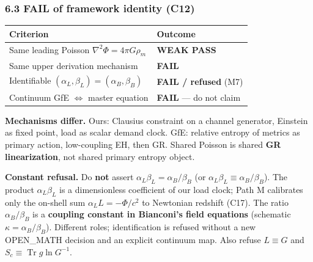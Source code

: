 \documentclass[
  11pt,
]{article}
\newcounter{none} %
\begin{document}
\subsubsection{\texorpdfstring{6.3 FAIL of framework identity
(\textbf{C12})}{6.3 FAIL of framework identity (C12)}}\label{fail-of-framework-identity-c12}

{\def\LTcaptype{none} %
\begin{longtable}[]{@{}
  >{\raggedright\arraybackslash}p{}
  >{\raggedright\arraybackslash}p{}@{}}
\toprule\noalign{}
\begin{minipage}[b]{\linewidth}\raggedright
Criterion
\end{minipage} & \begin{minipage}[b]{\linewidth}\raggedright
Outcome
\end{minipage} \\
\midrule\noalign{}
\endhead
\bottomrule\noalign{}
\endlastfoot
Same leading Poisson \(\nabla^2\Phi=4\pi G\rho_m\) & \textbf{WEAK
PASS} \\
Same upper derivation mechanism & \textbf{FAIL} \\
Identifiable \((\alpha_L,\beta_L)=(\alpha_B,\beta_B)\) & \textbf{FAIL /
refused} (M7) \\
Continuum GfE \(\Leftrightarrow\) master equation & \textbf{FAIL} --- do
not claim \\
\end{longtable}
}

\textbf{Mechanisms differ.} Ours: Clausius constraint on a channel
generator, Einstein as fixed point, load as scalar demand clock. GfE:
relative entropy of metrics as primary action, low-coupling EH, then GR.
Shared Poisson is shared \textbf{GR linearization}, not shared primary
entropy object.

\textbf{Constant refusal.} Do \textbf{not} assert
\(\alpha_L\beta_L=\alpha_B/\beta_B\) (or
\(\alpha_L\beta_L\equiv\alpha_B/\beta_B\)). The product
\(\alpha_L\beta_L\) is a dimensionless coefficient of our load clock;
Path M calibrates only the on-shell sum \(\alpha_L L=-\Phi/c^2\) to
Newtonian redshift (C17). The ratio \(\alpha_B/\beta_B\) is
a \textbf{coupling constant in Bianconi's field equations} (schematic
\(\kappa=\alpha_B/\beta_B\)). Different roles; identification is refused
without a new OPEN\_MATH decision and an explicit continuum map. Also
refuse \(L\equiv G\) and \(S_c\equiv\operatorname{Tr} g\ln G^{-1}\).
\end{document}
